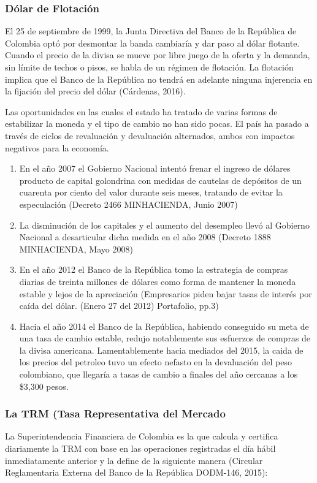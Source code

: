 \begin{spacing}{1.5}
\subsubsection{Dólar de Flotación}
El 25 de septiembre de 1999, la Junta Directiva del Banco de la República de Colombia optó por desmontar la banda cambiaría y dar paso al dólar flotante. Cuando el precio de la divisa se mueve por libre juego de la oferta y la demanda, sin límite de techos o pisos, se habla de un régimen de flotación. La flotación implica que el Banco de la República no tendrá en adelante ninguna injerencia en la fijación del precio del dólar (Cárdenas, 2016). 

Las oportunidades en las cuales el estado ha tratado de varias formas de estabilizar la moneda y el tipo de cambio no han sido pocas. El país ha pasado a través de ciclos de revaluación y devaluación alternados, ambos con impactos negativos para la economía. 

\begin{enumerate}
	\item En el año 2007 el Gobierno Nacional intentó frenar el ingreso de dólares producto de capital golondrina con medidas de cautelas de depósitos de un cuarenta por ciento del valor durante seis meses, tratando de evitar la especulación (Decreto 2466 MINHACIENDA, Junio 2007)
	\item La disminución de los capitales y el aumento del desempleo llevó al Gobierno Nacional a desarticular dicha medida en el año 2008 (Decreto 1888 MINHACIENDA, Mayo 2008)
	\item En el año 2012 el Banco de la República tomo la estrategia de compras diarias de treinta millones de dólares como forma de mantener la moneda estable y lejos de la apreciación (Empresarios piden bajar tasas de interés por caída del dólar. (Enero 27 del 2012) Portafolio, pp.3)
	\item Hacia el año 2014 el Banco de la República, habiendo conseguido su meta de una tasa de cambio estable, redujo notablemente sus esfuerzos de compras de la divisa americana. Lamentablemente hacia mediados del 2015, la caida de los precios del petroleo tuvo un efecto nefasto en la devaluación del peso colombiano, que llegaría a tasas de cambio a finales del año cercanas a los \$3,300 pesos. 
\end{enumerate}

\subsubsection{La TRM (Tasa Representativa del Mercado}
La Superintendencia Financiera de Colombia es la que calcula y certifica diariamente la TRM con base en las operaciones registradas el día hábil inmediatamente  anterior  y  la  define  de  la  siguiente  manera  (Circular  Reglamentaria Externa del Banco de la República DODM-146, 2015):


\end{spacing}
